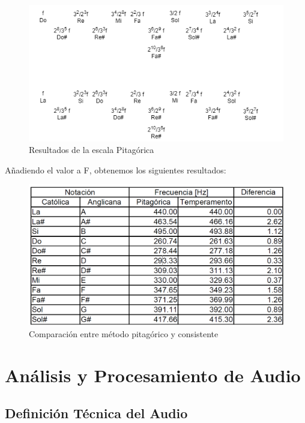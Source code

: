 \documentclass{book}
\begin{document}
	\begin{figure}[!b]
		\begin{center}
			\includegraphics[width=\textwidth]{Assets/images/Stern-Brocot_resultados}
			\caption{Resultados de la escala Pitagórica}
			\label{res-pit}
		\end{center}
	\end{figure}\pagebreak
	Añadiendo el valor a F, obtenemos los siguientes resultados:
	\begin{figure}[!b]
		\begin{center}
			\includegraphics[width=\textwidth]{Assets/images/cmp}
			\caption{Comparación entre método pitagórico y consistente}
			\label{comp-pit}
		\end{center}
	\end{figure}
	\section*{Análisis y Procesamiento de Audio}
	\subsection*{Definición Técnica del Audio}
\end{document}
